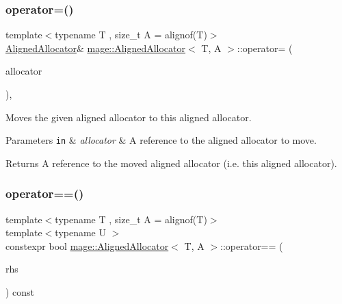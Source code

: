 \subsubsection{\texorpdfstring{operator=()}{operator=()}\hspace{0.1cm}{\footnotesize\ttfamily [2/2]}}
{\footnotesize\ttfamily template$<$typename T , size\+\_\+t A = alignof(\+T)$>$ \\
\mbox{\hyperlink{classmage_1_1_aligned_allocator}{Aligned\+Allocator}}\& \mbox{\hyperlink{classmage_1_1_aligned_allocator}{mage\+::\+Aligned\+Allocator}}$<$ T, A $>$\+::operator= (\begin{DoxyParamCaption}\item[{\mbox{\hyperlink{classmage_1_1_aligned_allocator}{Aligned\+Allocator}}$<$ T, A $>$ \&\&}]{allocator }\end{DoxyParamCaption})\hspace{0.3cm}{\ttfamily [default]}, {\ttfamily [noexcept]}}

Moves the given aligned allocator to this aligned allocator.


\begin{DoxyParams}[1]{Parameters}
\mbox{\tt in}  & {\em allocator} & A reference to the aligned allocator to move. \\
\hline
\end{DoxyParams}
\begin{DoxyReturn}{Returns}
A reference to the moved aligned allocator (i.\+e. this aligned allocator). 
\end{DoxyReturn}
\mbox{\label{classmage_1_1_aligned_allocator_aefad04504ff2eb8f73c9ebd15d7fbdad}} 
\subsubsection{\texorpdfstring{operator==()}{operator==()}}
{\footnotesize\ttfamily template$<$typename T , size\+\_\+t A = alignof(\+T)$>$ \\
template$<$typename U $>$ \\
constexpr bool \mbox{\hyperlink{classmage_1_1_aligned_allocator}{mage\+::\+Aligned\+Allocator}}$<$ T, A $>$\+::operator== (\begin{DoxyParamCaption}\item[{\mbox{[}\mbox{[}maybe\+\_\+unused\mbox{]} \mbox{]} const \mbox{\hyperlink{classmage_1_1_aligned_allocator}{Aligned\+Allocator}}$<$ U, A $>$ \&}]{rhs }\end{DoxyParamCaption}) const\hspace{0.3cm}{\ttfamily [noexcept]}}

